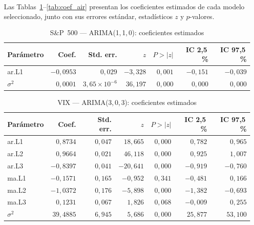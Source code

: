 \documentclass[12pt, a4paper]{article}
\begin{document}
Las Tablas~\ref{tab:coef_sp500}--\ref{tab:coef_air} presentan los coeficientes estimados de cada modelo seleccionado, junto con sus errores estándar, estadísticos $z$ y $p$-valores.

\begin{table}[H]
    \centering
    \caption{S\&P~500 — ARIMA(1,\,1,\,0): coeficientes estimados}
    \label{tab:coef_sp500}
    \begin{tabular}{lrrrrrr}
        \toprule
        \textbf{Parámetro} & \textbf{Coef.} & \textbf{Std. err.} & \textbf{$z$} & \textbf{$P>|z|$} & \textbf{IC 2,5\,\%} & \textbf{IC 97,5\,\%} \\
        \midrule
        ar.L1   & $-0{,}0953$ & $0{,}029$ & $-3{,}328$ & $0{,}001$ & $-0{,}151$ & $-0{,}039$ \\
        $\sigma^2$ & $0{,}0001$ & $3{,}65\times10^{-6}$ & $36{,}197$ & $0{,}000$ & $0{,}000$ & $0{,}000$ \\
        \bottomrule
    \end{tabular}
\end{table}

\begin{table}[H]
    \centering
    \caption{VIX — ARIMA(3,\,0,\,3): coeficientes estimados}
    \label{tab:coef_vix}
    \begin{tabular}{lrrrrrr}
        \toprule
        \textbf{Parámetro} & \textbf{Coef.} & \textbf{Std. err.} & \textbf{$z$} & \textbf{$P>|z|$} & \textbf{IC 2,5\,\%} & \textbf{IC 97,5\,\%} \\
        \midrule
        ar.L1      &  $0{,}8734$ & $0{,}047$ &  $18{,}665$ & $0{,}000$ &  $0{,}782$ &  $0{,}965$ \\
        ar.L2      &  $0{,}9664$ & $0{,}021$ &  $46{,}118$ & $0{,}000$ &  $0{,}925$ &  $1{,}007$ \\
        ar.L3      & $-0{,}8397$ & $0{,}041$ & $-20{,}641$ & $0{,}000$ & $-0{,}919$ & $-0{,}760$ \\
        ma.L1      & $-0{,}1571$ & $0{,}165$ &  $-0{,}952$ & $0{,}341$ & $-0{,}481$ &  $0{,}166$ \\
        ma.L2      & $-1{,}0372$ & $0{,}176$ &  $-5{,}898$ & $0{,}000$ & $-1{,}382$ & $-0{,}693$ \\
        ma.L3      &  $0{,}1231$ & $0{,}067$ &   $1{,}826$ & $0{,}068$ & $-0{,}009$ &  $0{,}255$ \\
        $\sigma^2$ & $39{,}4885$ & $6{,}945$ &   $5{,}686$ & $0{,}000$ & $25{,}877$ & $53{,}100$ \\
        \bottomrule
    \end{tabular}
\end{table}
\end{document}
